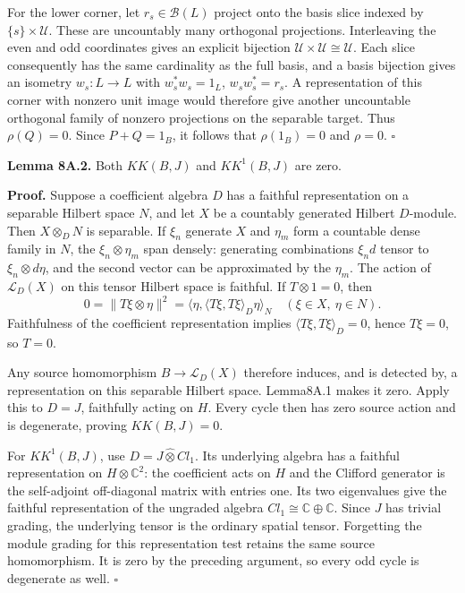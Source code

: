 \documentclass[
  11pt,
]{article}
\begin{document}
For the lower corner, let \(r_s\in\mathcal B(L)\) project onto the basis
slice indexed by \(\{s\}\times\mathcal U\). These are uncountably many
orthogonal projections. Interleaving the even and odd coordinates gives
an explicit bijection \(\mathcal U\times\mathcal U\cong\mathcal U\).
Each slice consequently has the same cardinality as the full basis, and
a basis bijection gives an isometry \(w_s:L\to L\) with
\(w_s^*w_s=1_L\), \(w_sw_s^*=r_s\). A representation of this corner with
nonzero unit image would therefore give another uncountable orthogonal
family of nonzero projections on the separable target. Thus
\(\rho(Q)=0\). Since \(P+Q=1_B\), it follows that \(\rho(1_B)=0\) and
\(\rho=0\). \(\square\)

\textbf{Lemma 8A.2.} Both \(KK(B,J)\) and \(KK^1(B,J)\) are zero.

\textbf{Proof.} Suppose a coefficient algebra \(D\) has a faithful
representation on a separable Hilbert space \(N\), and let \(X\) be a
countably generated Hilbert \(D\)-module. Then \(X\otimes_DN\) is
separable. If \(\xi_n\) generate \(X\) and \(\eta_m\) form a countable
dense family in \(N\), the \(\xi_n\otimes\eta_m\) span densely:
generating combinations \(\xi_nd\) tensor to \(\xi_n\otimes d\eta\), and
the second vector can be approximated by the \(\eta_m\). The action of
\(\mathcal L_D(X)\) on this tensor Hilbert space is faithful. If
\(T\otimes1=0\), then \[
 0=\|T\xi\otimes\eta\|^2
   =\langle\eta,\langle T\xi,T\xi\rangle_D\eta\rangle_N
 \quad(\xi\in X,\ \eta\in N).
 \tag{BC.4}
\] Faithfulness of the coefficient representation implies
\(\langle T\xi,T\xi\rangle_D=0\), hence \(T\xi=0\), so \(T=0\).

Any source homomorphism \(B\to\mathcal L_D(X)\) therefore induces, and
is detected by, a representation on this separable Hilbert space.
Lemma8A.1 makes it zero. Apply this to \(D=J\), faithfully acting on
\(H\). Every cycle then has zero source action and is degenerate,
proving \(KK(B,J)=0\).

For \(KK^1(B,J)\), use \(D=J\widehat\otimes Cl_1\). Its underlying
algebra has a faithful representation on \(H\otimes\mathbb C^2\): the
coefficient acts on \(H\) and the Clifford generator is the self-adjoint
off-diagonal matrix with entries one. Its two eigenvalues give the
faithful representation of the ungraded algebra
\(Cl_1\cong\mathbb C\oplus\mathbb C\). Since \(J\) has trivial grading,
the underlying tensor is the ordinary spatial tensor. Forgetting the
module grading for this representation test retains the same source
homomorphism. It is zero by the preceding argument, so every odd cycle
is degenerate as well. \(\square\)
\end{document}
